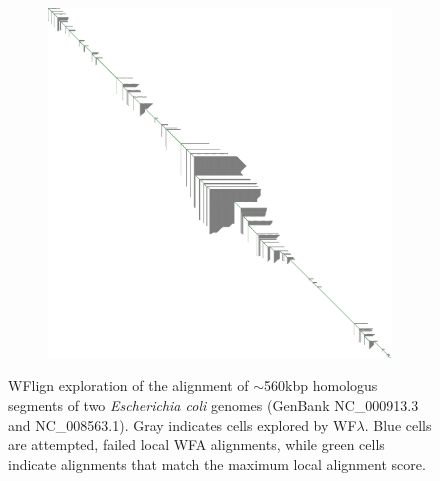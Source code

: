 \begin{figure}[t!]
    \begin{subfigure}{\linewidth}
        \centering
        \includegraphics[width=1.0\linewidth, trim=-0cm 2cm 0 0cm]{fig/wflign.png}
        \label{fig:bad-sorting}
    \end{subfigure}
    \caption{
      WFlign exploration of the alignment of $\sim$560kbp homologus segments of two \textit{Escherichia coli} genomes (GenBank NC\_000913.3 and NC\_008563.1).
      Gray indicates cells explored by WF$\lambda$.
      Blue cells are attempted, failed local WFA alignments, while green cells indicate alignments that match the maximum local alignment score.
    }
    \label{fig:wflambda}
\end{figure}
